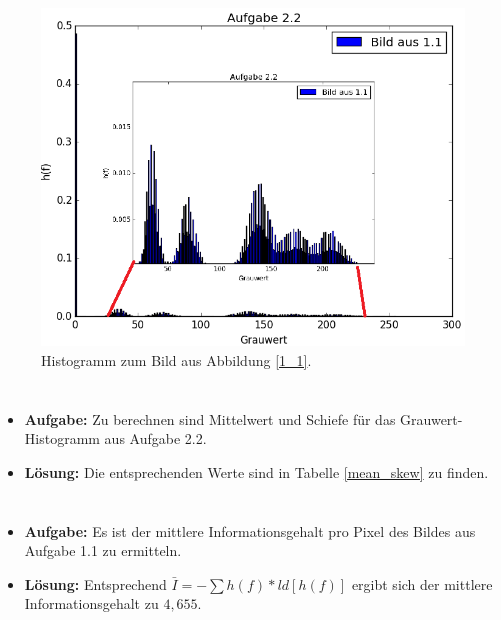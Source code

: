 \documentclass[12pt, a4paper, twoside]{report}
\begin{document}
\begin{figure}[h]
\centering
\includegraphics[width=\textwidth]{../bilder/hist.png}
\caption{Histogramm zum Bild aus Abbildung \ref{1_1}.}
\label{2_2}
\end{figure}

\section{}
\begin{itemize}
\item \textbf{Aufgabe:} Zu berechnen sind Mittelwert und Schiefe für das Grauwert-Histogramm aus Aufgabe 2.2.
\item \textbf{Lösung:} Die entsprechenden Werte sind in Tabelle \ref{mean_skew} zu finden.
\end{itemize}

\section{}
\begin{itemize}
\item \textbf{Aufgabe:} Es ist der mittlere Informationsgehalt pro Pixel des Bildes aus Aufgabe 1.1 zu ermitteln.
\item \textbf{Lösung:} Entsprechend $\bar{I} = -\sum h(f) * ld[h(f)]$ ergibt sich der mittlere Informationsgehalt zu $4,655$.
\end{itemize}
\end{document}
